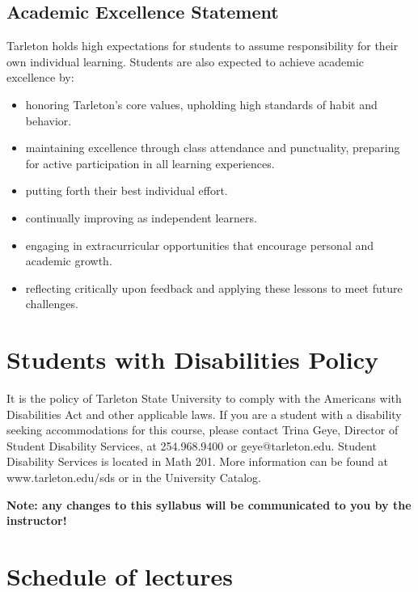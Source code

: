 \documentclass[10pt]{article}
\begin{document}
\subsection*{Academic Excellence Statement}
\label{sec-9-3}
Tarleton holds high expectations for students to assume responsibility for their own individual learning. Students are also expected to achieve academic excellence by:
\begin{itemize}
\item honoring Tarleton’s core values, upholding high standards of habit and behavior.
\item maintaining excellence through class attendance and punctuality, preparing for active participation in all learning experiences.
\item putting forth their best individual effort.
\item continually improving as independent learners.
\item engaging in extracurricular opportunities that encourage personal and academic growth.
\item reflecting critically upon feedback and applying these lessons to meet future challenges.
\end{itemize}

\section*{Students with Disabilities Policy}
\label{sec-10}

It is the policy of Tarleton State University to comply with the Americans
with Disabilities Act and other applicable laws. If you are a student with a
disability seeking accommodations for this course, please contact Trina
Geye, Director of Student Disability Services, at 254.968.9400 or
geye@tarleton.edu. Student Disability Services is
located in Math 201. More information can be found at www.tarleton.edu/sds or in the University Catalog.


\textbf{\textbf{Note:  any changes to this syllabus will be communicated to you by the instructor!}}

\section*{Schedule of lectures}
\label{sec-11}
\end{document}
